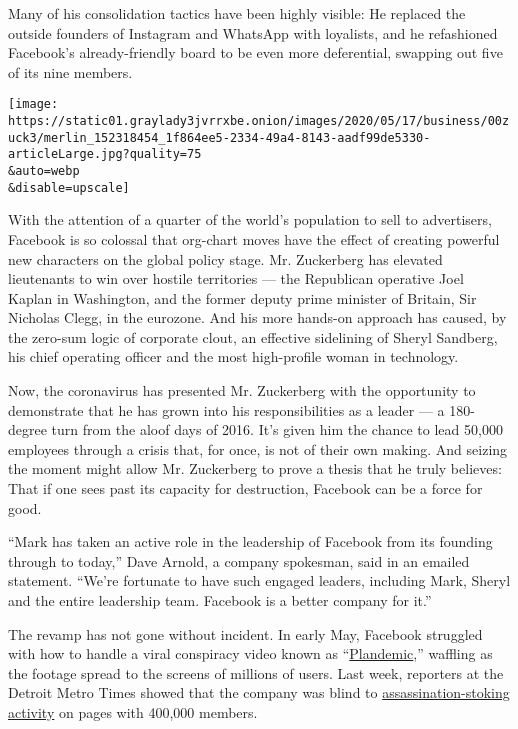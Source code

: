 Many of his consolidation tactics have been highly visible: He replaced
the outside founders of Instagram and WhatsApp with loyalists, and he
refashioned Facebook's already-friendly board to be even more
deferential, swapping out five of its nine members.

\texttt{[image: https://static01.graylady3jvrrxbe.onion/images/2020/05/17/business/00zuck3/merlin\_152318454\_1f864ee5-2334-49a4-8143-aadf99de5330-articleLarge.jpg?quality=75\\\&auto=webp\\\&disable=upscale]}

With the attention of a quarter of the world's population to sell to
advertisers, Facebook is so colossal that org-chart moves have the
effect of creating powerful new characters on the global policy stage.
Mr. Zuckerberg has elevated lieutenants to win over hostile territories
--- the Republican operative Joel Kaplan in Washington, and the former
deputy prime minister of Britain, Sir Nicholas Clegg, in the eurozone.
And his more hands-on approach has caused, by the zero-sum logic of
corporate clout, an effective sidelining of Sheryl Sandberg, his chief
operating officer and the most high-profile woman in technology.

Now, the coronavirus has presented Mr. Zuckerberg with the opportunity
to demonstrate that he has grown into his responsibilities as a leader
--- a 180-degree turn from the aloof days of 2016. It's given him the
chance to lead 50,000 employees through a crisis that, for once, is not
of their own making. And seizing the moment might allow Mr. Zuckerberg
to prove a thesis that he truly believes: That if one sees past its
capacity for destruction, Facebook can be a force for good.

``Mark has taken an active role in the leadership of Facebook from its
founding through to today,'' Dave Arnold, a company spokesman, said in
an emailed statement. ``We're fortunate to have such engaged leaders,
including Mark, Sheryl and the entire leadership team. Facebook is a
better company for it.''

The revamp has not gone without incident. In early May, Facebook
struggled with how to handle a viral conspiracy video known as
``\href{https://www.nytimes3xbfgragh.onion/2020/05/09/technology/plandemic-judy-mikovitz-coronavirus-disinformation.html}{Plandemic},''
waffling as the footage spread to the screens of millions of users. Last
week, reporters at the Detroit Metro Times showed that the company was
blind to
\href{https://www.metrotimes.com/news-hits/archives/2020/05/11/whitmer-becomes-target-of-dozens-of-threats-on-private-facebook-groups-ahead-of-armed-rally-in-lansing}{assassination-stoking
activity} on pages with 400,000 members.

